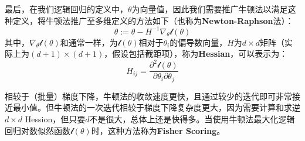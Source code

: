 最后，在我们逻辑回归的定义中，$\theta$为向量值，因此我们需要推广牛顿法以满足这种定义，将牛顿法推广至多维定义的方法如下（也称为\textbf{Newton-Raphson}法）：
$$
\theta:=\theta-H^{-1}\nabla_{\theta}\mathcal{l}(\theta)
$$
其中，$\nabla_{\theta}\mathcal{l}(\theta)$和通常一样，为$\mathcal{l}(\theta)$相对于$\theta_i$的偏导数向量，$H$为$d \times d$矩阵（实际上为$(d+1) \times (d+1)$，假设包括截距项），称为\textbf{Hessian}，可以表示为：
$$
H_{ij}=\frac{\partial^2 \mathcal{l}(\theta)}{\partial \theta_i \partial \theta_j}
$$

相较于（批量）梯度下降，牛顿法的收敛速度更快，且通过较少的迭代即可非常接近最小值。但牛顿法的一次迭代相较于梯度下降复杂度更大，因为需要计算和求逆$d \times d$ Hession，但只要$d$不是很大，总体上还是快得多。当使用牛顿法最大化逻辑回归对数似然函数$\mathcal{l}(\theta)$时，这种方法称为\textbf{Fisher Scoring}。

